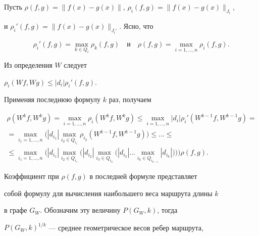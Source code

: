 \begin{pf}


Пусть $\rho(f, g)= \|f(x)-g(x)\| $, $\rho_i (f,g) = \|f(x)-g(x)\|_{J_i} $,


и $\rho_i' (f,g) = \|f(x)-g(x)\|_{J_i'} $. Ясно, что


$$


\rho_i' (f,g) = \max_{k \in Q_i} \rho_k(f,g)


\quad \text{и} \quad


\rho (f,g) = \max_{i=1,\dotsc,n} \rho_i (f,g).


$$


Из определения $W$ следует


$\rho_i (Wf,Wg) \le |d_i| \rho_i'(f,g)$.


Применяя последнюю формулу $k$ раз, получаем


\begin{multline*}


\rho (W^k f,W^k g) =


\max_{i=1,\dotsc,n} \rho_i (W^k f,W^k g) \le


\max_{i=1,\dotsc,n} |d_i| \rho_i'(W^{k-1}f,W^{k-1}g) = \\


%


= \max_{i_1=1,\dotsc,n}


\big(|d_{i_1} | \max_{ i_2 \in Q_{i_1} } \rho_{i_2}(W^{k-1}f,W^{k-1}g)\big)


\le \dotsc \le \\


%


\le \max_{i_1=1,\dotsc,n}


\big(|d_{i_1} |\max_{ i_2 \in Q_{i_1}}


\big(|d_{i_2}|\max_{{i_3} \in Q_{i_2}}


\big(|d_{i_3}|\dotsc \max_{{i_k} \in Q_{i_{k-1}}} |d_{i_k}| \big)\big)


\big)\rho(f,g). 


\end{multline*}





Коэффициент при $\rho(f,g)$ в последней формуле представляет


собой формулу для вычисления наибольшего веса маршрута длины $k$


в графе $G_W$. Обозначим эту величину $P(G_W,k)$, тогда


$P(G_W,k)^{1/k}$ --- среднее геометрическое весов ребер маршрута,



\end{pf}
